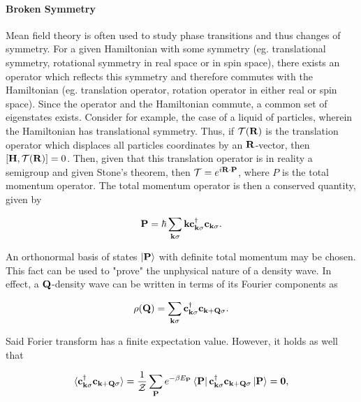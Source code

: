 \documentclass{homework}
\begin{document}
\paragraph{\textbf{Broken Symmetry}}

Mean field theory is often used to study phase transitions and thus changes of symmetry. For a given Hamiltonian with some symmetry (eg. translational symmetry, rotational symmetry in real space or in spin space), there exists an operator which reflects this symmetry and therefore commutes with the Hamiltonian (eg. translation operator, rotation operator in either real or spin space). Since the operator and the Hamiltonian commute, a common set of eigenstates exists. Consider for example, the case of a liquid of particles, wherein the Hamiltonian has translational symmetry. Thus, if ${\mathcal{T}}({\bf R})$ is the translation operator which displaces all particles coordinates by an ${\bf R}$-vector, then $[{\bf H}, {\mathcal{T}}({\bf R})] = 0$. Then, given that this translation operator is in reality a semigroup and given Stone's theorem, then ${\mathcal{T}} = e^{i {\bf R} \cdot {\bf P}}$, where $P$ is the total momentum operator. The total momentum operator is then a conserved quantity, given by 

$$
    {\bf P} = \hbar \sum_{{\bf k} \sigma} {\bf k} {\bf c}^\dagger_{{\bf k} \sigma} {\bf c}_{{\bf k} \sigma}.
$$

An orthonormal basis of states $\ket{{\bf P}}$ with definite total momentum may be chosen. This fact can be used to "prove" the unphysical nature of a density wave. In effect, a ${\bf Q}$-density wave can be written in terms of its Fourier components as 

$$
\rho({\bf Q}) = \sum_{{\bf k}\sigma} {\bf c}_{{\bf k}\sigma}^\dagger {\bf c}_{{\bf k + Q}\sigma}.
$$

Said Forier transform has a finite expectation value. However, it holds as well that

$$
\langle {\bf c}_{{\bf k}\sigma}^\dagger {\bf c}_{{\bf k} + {\bf Q}\sigma} \rangle = \frac{1}{\mathcal{Z}} \sum_{{\bf P}} e^{-\beta E_{{\bf P}}} \bra{{\bf P}} {\bf c}_{{\bf k}\sigma}^\dagger {\bf c}_{{\bf k + Q}\sigma} \ket{{\bf P}} = 0,
$$
\end{document}
